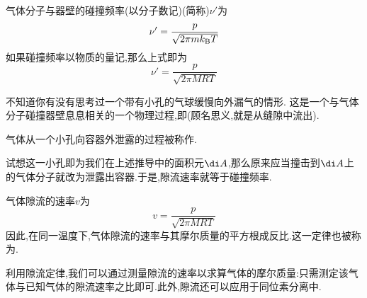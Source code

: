 \documentclass{ctexart}
\begin{document}
\begin{theorem}[1B.4.4 气体分子与器壁的碰撞频率]
    气体分子与器壁的碰撞频率(以分子数记)(简称)$\nu'$为
    \[\nu'=\dfrac{p}{\sqrt{2\pi mk_\text BT}}\]
    如果碰撞频率以物质的量记,那么上式即为
    \[\nu'=\dfrac{p}{\sqrt{2\pi MRT}}\]

\end{theorem}
不知道你有没有思考过一个带有小孔的气球缓慢向外漏气的情形.%
这是一个与气体分子碰撞器壁息息相关的一个物理过程,即(顾名思义,就是从缝隙中流出).
\begin{definition}[1B.4.5 隙流]
    气体从一个小孔向容器外泄露的过程被称作.
\end{definition}
试想这一小孔即为我们在上述推导中的面积元$\di A$,那么原来应当撞击到$\di A$上的气体分子就改为泄露出容器.于是,隙流速率就等于碰撞频率.
\begin{theorem}
    气体隙流的速率$v$为
    \[v=\dfrac{p}{\sqrt{2\pi MRT}}\]
    因此,在同一温度下,气体隙流的速率与其摩尔质量的平方根成反比.这一定律也被称为.
\end{theorem}
利用隙流定律,我们可以通过测量隙流的速率以求算气体的摩尔质量:只需测定该气体与已知气体的隙流速率之比即可.此外,隙流还可以应用于同位素分离中.
\end{document}
